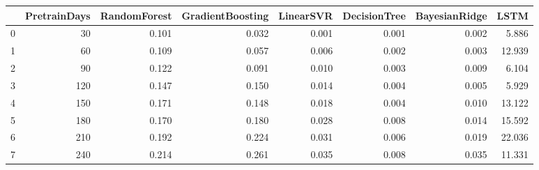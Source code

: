 \begin{tabular}{lrrrrrrr}
\toprule
{} &  PretrainDays &  RandomForest &  GradientBoosting &  LinearSVR &  DecisionTree &  BayesianRidge &   LSTM \\
\midrule
0 &            30 &         0.101 &             0.032 &      0.001 &         0.001 &          0.002 &  5.886 \\
1 &            60 &         0.109 &             0.057 &      0.006 &         0.002 &          0.003 & 12.939 \\
2 &            90 &         0.122 &             0.091 &      0.010 &         0.003 &          0.009 &  6.104 \\
3 &           120 &         0.147 &             0.150 &      0.014 &         0.004 &          0.005 &  5.929 \\
4 &           150 &         0.171 &             0.148 &      0.018 &         0.004 &          0.010 & 13.122 \\
5 &           180 &         0.170 &             0.180 &      0.028 &         0.008 &          0.014 & 15.592 \\
6 &           210 &         0.192 &             0.224 &      0.031 &         0.006 &          0.019 & 22.036 \\
7 &           240 &         0.214 &             0.261 &      0.035 &         0.008 &          0.035 & 11.331 \\
\bottomrule
\end{tabular}
